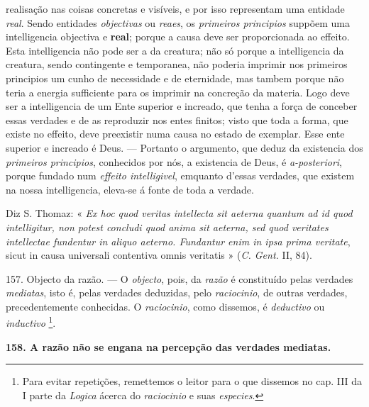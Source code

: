 realisação nas coisas concretas e visíveis, e por isso representam uma entidade \emph{real}. Sendo entidades \emph{objectivas} ou \emph{reaes}, os \emph{primeiros principios} suppõem uma intelligencia objectiva e \textbf{real}; porque a causa deve ser proporcionada ao effeito. Esta intelligencia não pode ser a da creatura; não só porque a intelligencia da creatura, sendo contingente e temporanea, não poderia imprimir nos primeiros principios um cunho de necessidade e de eternidade, mas tambem porque não teria a energia sufficiente para os imprimir na concreção da materia. Logo deve ser a intelligencia de um Ente superior e increado, que tenha a força de conceber essas verdades e de as reproduzir nos entes finitos; visto que toda a forma, que existe no effeito, deve preexistir numa causa no estado de exemplar. Esse ente superior e increado é Deus. --- Portanto o argumento, que deduz da existencia dos \emph{primeiros principios}, conhecidos por nós, a existencia de Deus, é \emph{a-posteriori}, porque fundado num \emph{effeito intelligivel}, emquanto d'essas verdades, que existem na nossa intelligencia, eleva-se á fonte de toda a verdade.

Diz S. Thomaz: « \emph{Ex hoc quod veritas intellecta sit aeterna quantum ad id quod intelligitur, non potest concludi quod anima sit aeterna, sed quod veritates intellectae fundentur in aliquo aeterno. Fundantur enim in ipsa prima veritate}, sicut in causa universali contentiva omnis veritatis » (\emph{C. Gent.} II, 84).

157. Objecto da razão. --- O \emph{objecto}, pois, da \emph{razão} é constituído pelas verdades \emph{mediatas}, isto é, pelas verdades deduzidas, pelo \emph{raciocinio}, de outras verdades, precedentemente conhecidas. O \emph{raciocinio}, como dissemos, é \emph{deductivo} ou \emph{inductivo} \footnote{Para evitar repetições, remettemos o leitor para o que dissemos no cap. III da I parte da \emph{Logica} ácerca do \emph{raciocinio} e suas \emph{especies}.}.

\textbf{158. A razão não se engana na percepção das verdades mediatas.}

